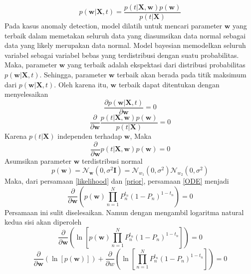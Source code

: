 \begin{equation}
    p(\mathbf{w}|\mathbf{X},t)=\frac{p(t|\mathbf{X},\mathbf{w})p(\mathbf{w})}{p(t|\mathbf{X})}
\end{equation}
Pada kasus anomaly detection, model dilatih untuk mencari parameter $\mathbf{w}$ yang terbaik dalam memetakan seluruh data yang diasumsikan data normal sebagai data yang likely merupakan data normal. Model bayesian memodelkan seluruh variabel sebagai variabel bebas yang terdistribusi dengan suatu probabilitas. Maka, parameter $\mathbf{w}$ yang terbaik adalah ekspektasi dari distribusi probabilitas $p(\mathbf{w}|\mathbf{X},t)$. Sehingga, parameter $\mathbf{w}$ terbaik akan berada pada titik maksimum dari $p(\mathbf{w}|\mathbf{X},t)$. Oleh karena itu, $\mathbf{w}$ terbaik dapat ditentukan dengan menyelesaikan
\begin{equation*}
    \frac{\partial{p(\mathbf{w}|\mathbf{X},t)}}{\partial{\mathbf{w}}} = 0
\end{equation*}
\begin{equation*}
    \frac{\partial}{\partial{\mathbf{w}}} \frac{p(t|\mathbf{X},\mathbf{w})p(\mathbf{w})}{p(t|\mathbf{X})} = 0
\end{equation*}
Karena $p(t|\mathbf{X})$ independen terhadap $\mathbf{w}$, Maka
\begin{equation}
    \frac{\partial}{\partial{\mathbf{w}}} p(t|\mathbf{X},\mathbf{w})p(\mathbf{w}) = 0 \label{ODE}
\end{equation}
Asumsikan parameter $\mathbf{w}$ terdistribusi normal
\begin{equation}
    p(\mathbf{w})=\mathcal{N}_\mathbf{w}\left(0,\sigma^2\mathbf{I}\right)=\mathcal{N}_{w_1}\left(0,\sigma^2\right)\mathcal{N}_{w_2}\left(0,\sigma^2\right) \label{prior}
\end{equation}
Maka, dari persamaan \ref{likelihood} dan \ref{prior}, persamaan \ref{ODE} menjadi
\begin{equation}
    \frac{\partial{}}{\partial{\mathbf{w}}} \left(p(\mathbf{w})\prod_{n=1}^{N} P_n^{t_n}\left(1-P_n\right)^{1-t_n}\right)=0
\end{equation}
Persamaan ini sulit diselesaikan. Namun dengan mengambil logaritma natural kedua sisi akan diperoleh
\begin{equation*}
    \frac{\partial{}}{\partial{\mathbf{w}}} \left(\ln{\left[p(\mathbf{w})\prod_{n=1}^{N} P_n^{t_n}\left(1-P_n\right)^{1-t_n}\right]}\right)=0
\end{equation*}
\begin{equation}
    \frac{\partial{}}{\partial{\mathbf{w}}}\left(\ln{\left[ p(\mathbf{w}) \right]}\right) + \frac{\partial{}}{\partial{w}} \left(\ln{\left[ \prod_{n=1}^{N} P_n^{t_n}\left(1-P_n\right)^{1-t_n}\right] }\right)=0
\end{equation}
